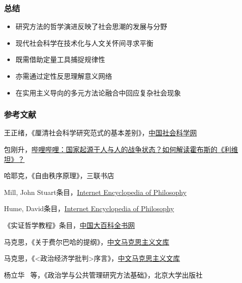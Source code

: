 \documentclass{beamer}
\begin{document}
\begin{frame}
\frametitle{总结}
\begin{itemize}
\item 研究方法的哲学演进反映了社会思潮的发展与分野
\item 现代社会科学在技术化与人文关怀间寻求平衡
\item 既需借助定量工具捕捉规律性
\item 亦需通过定性反思理解意义网络
\item 在实用主义导向的多元方法论融合中回应复杂社会现象
\end{itemize}
\end{frame}

\begin{frame}
\frametitle{参考文献}
\small
\begin{thebibliography}{99}
	王正绪，《厘清社会科学研究范式的基本差别》，\href{https://www.cssn.cn/skgz/bwyc/202409/t20240913_5777429.shtml}{中国社会科学网}
	
	包刚升，\href{https://www.bilibili.com/video/BV1S2HsePERE}{哔哩哔哩：国家起源于人与人的战争状态？如何解读霍布斯的《利维坦》？}
	
	哈耶克，《自由秩序原理》，三联书店
	
	Mill, John Stuart条目，\href{https://iep.utm.edu/milljs/}{Internet Encyclopedia of Philosophy}
	
	Hume, David条目，\href{https://iep.utm.edu/hume/}{Internet Encyclopedia of Philosophy}
	
	《实证哲学教程》条目，\href{https://www.zgbk.com/ecph/words?SiteID=1&ID=399321}{中国大百科全书网}
	
	马克思，《关于费尔巴哈的提纲》，\href{https://www.marxists.org/chinese/marx/marxist.org-chinese-marx-1845.htm}{中文马克思主义文库}
	
	马克思，《<政治经济学批判>序言》，\href{https://www.marxists.org/chinese/marx/06.htm}{中文马克思主义文库}
	
	杨立华 \ 等，《政治学与公共管理研究方法基础》，北京大学出版社
\end{thebibliography}
\end{frame}
\end{document}
